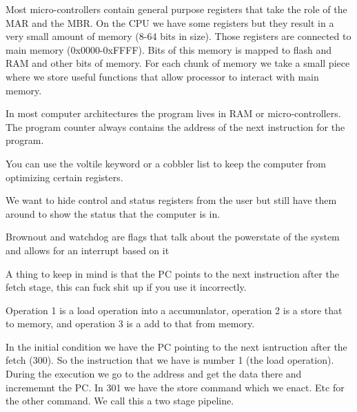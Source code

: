 \documentclass[12pt]{article}
\begin{document}







Most micro-controllers contain general purpose registers that take the role of the MAR and the MBR. On the CPU we have some registers but they result in a very small amount of memory (8-64 bits in size). Those registers are connected to main memory (0x0000-0xFFFF). Bits of this memory is mapped to flash and RAM and other bits of memory. For each chunk of memory we take a small piece where we store useful functions that allow processor to interact with main memory.



In most computer architectures the program lives in RAM or micro-controllers. The program counter always contains the address of the next instruction for the program.


You can use the voltile keyword or a cobbler list to keep the computer from optimizing certain registers.



We want to hide control and status registers from the user but still have them around to show the status that the computer is in.




Brownout and watchdog are flags that talk about the powerstate of the system and allows for an interrupt based on it







A thing to keep in mind is that the PC points to the next instruction after the fetch stage, this can fuck shit up if you use it incorrectly.




Operation 1 is a load operation into a accumunlator, operation 2 is a store that to memory, and operation 3 is a add to that from memory.


In the initial condition we have the PC pointing to the next isntruction after the fetch (300). So the instruction that we have is number 1 (the load operation). During the execution we go to the address and get the data there and  incrememnt the PC. In 301 we have the store command which we enact. Etc for the other command. We call this a two stage pipeline.
\end{document}
